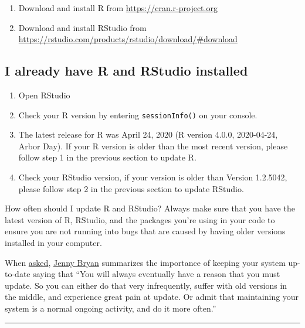 \documentclass[]{book}
\providecommand{\tightlist}{%
  \setlength{\itemsep}{0pt}\setlength{\parskip}{0pt}}
\begin{document}
\begin{enumerate}
\def\labelenumi{\arabic{enumi}.}
\tightlist
\item
  Download and install R from \url{https://cran.r-project.org}
\item
  Download and install RStudio from \url{https://rstudio.com/products/rstudio/download/\#download}
\end{enumerate}

\hypertarget{i-already-have-r-and-rstudio-installed}{%
\subsection{I already have R and RStudio installed}\label{i-already-have-r-and-rstudio-installed}}

\begin{enumerate}
\def\labelenumi{\arabic{enumi}.}
\tightlist
\item
  Open RStudio
\item
  Check your R version by entering \texttt{sessionInfo()} on your console.
\item
  The latest release for R was April 24, 2020 (R version 4.0.0, 2020-04-24, Arbor Day). If your R version is older than the most recent version, please follow step 1 in the previous section to update R.
\item
  Check your RStudio version, if your version is older than Version 1.2.5042, please follow step 2 in the previous section to update RStudio.
\end{enumerate}

\leavevmode\hypertarget{explanation}{}%
How often should I update R and RStudio? Always make sure that you have the latest version of R, RStudio, and the packages you're using in your code to ensure you are not running into bugs that are caused by having older versions installed in your computer.

When \href{https://community.rstudio.com/t/should-i-update-all-my-r-packages-frequently-yes-no-why/5856/4}{asked}, \href{https://community.rstudio.com/u/jennybryan}{Jenny Bryan} summarizes the importance of keeping your system up-to-date saying that ``You will always eventually have a reason that you must update. So you can either do that very infrequently, suffer with old versions in the middle, and experience great pain at update. Or admit that maintaining your system is a normal ongoing activity, and do it more often.''

\begin{center}\rule{0.5\linewidth}{0.5pt}\end{center}
\end{document}
